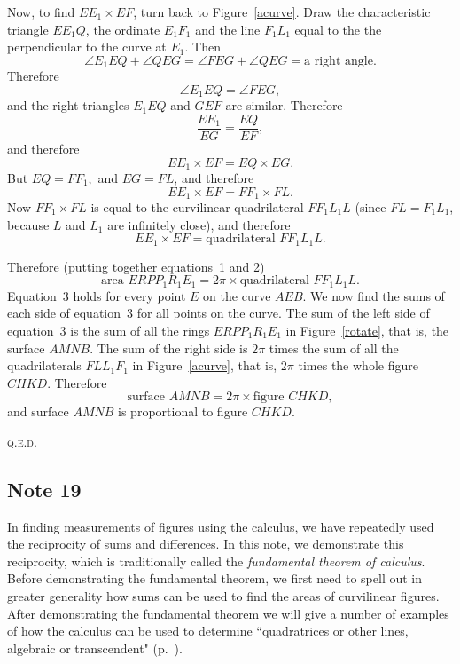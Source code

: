 \documentclass[polutonikogreek,english,twoside,openright]{article}
\begin{document}
Now, to find $EE_1 \times EF$, turn back to Figure~\ref{acurve}. 
Draw
the characteristic triangle $EE_1Q$, the ordinate $E_1F_1$ and the
line $F_1L_1$ equal to the the perpendicular to the curve at $E_1$.
Then %
$$\angle E_1EQ + \angle QEG  = \angle FEG + \angle QEG = \mbox{a right angle.}$$
Therefore
$$\angle E_1EQ = \angle FEG,$$
and the right triangles $E_1EQ$ and $GEF$ are similar.  Therefore
$$\frac{EE_1}{EG} = \frac{EQ}{EF},$$
and therefore
$$EE_1\times EF = EQ \times EG.$$
But $EQ = FF_1,$ and $EG = FL$, and therefore
$$EE_1\times EF = FF_1 \times FL.$$
Now
$FF_1 \times FL$ is equal to the  curvilinear quadrilateral $FF_1L_1L$
(since $FL = F_1L_1$, because $L$ and $L_1$ are infinitely close), and therefore
\begin{equation}
EE_1\times EF = \mbox{quadrilateral }FF_1L_1L.
\end{equation}


Therefore (putting together equations~1 and 2)
\begin{equation}
\mbox{area }ERPP_1R_1E_1 = 2\pi\times \mbox{quadrilateral }FF_1L_1L.
\end{equation}
Equation~3 holds for every point $E$ on the curve $AEB$. We now find
the sums of each side of equation~3 for all points on the curve.  The
sum of the left side of equation~3 is the sum of all the rings
$ERPP_1R_1E_1$ in Figure~\ref{rotate}, that is, the surface $AMNB$.
The sum of the right side is $2\pi$ times the sum of all the
quadrilaterals $FLL_1F_1$ in Figure~\ref{acurve}, that is, $2\pi$
times the whole figure $CHKD$.  Therefore
$$\mbox{surface }AMNB = 2\pi\times \mbox{figure }CHKD,$$
and surface $AMNB$ is proportional to figure $CHKD$.

\noindent  \textsc{q.e.d.}

\subsection*{Note 19}
\label{crg19}

In finding measurements of figures using the calculus, we have
repeatedly used the reciprocity of sums and differences.  In this
note, we demonstrate this reciprocity, which is traditionally called
the {\em fundamental theorem of calculus}.  Before demonstrating the
fundamental theorem, we first need to spell out in greater generality
how sums can be used to find the areas of curvilinear figures.  After
demonstrating the fundamental theorem we will give a number of
examples of how the calculus can be used to determine ``quadratrices
or other lines, algebraic or transcendent" (p.~\pageref{quadothalg}).
\end{document}
